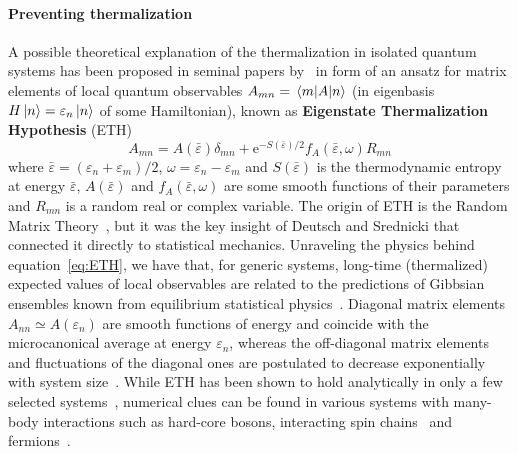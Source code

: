 \paragraph{Preventing thermalization} A possible theoretical explanation of the thermalization in isolated quantum systems
has been proposed in seminal papers by~\textcite{Deutsch19912046,Srednicki1994} in form of an ansatz for matrix elements of
local quantum observables \(A_{mn} = \matrixel{m}{A}{n}\) (in eigenbasis \(H\ket{n}=\varepsilon_n \ket{n}\) of some Hamiltonian),
known as \textbf{Eigenstate Thermalization Hypothesis} (ETH)
\begin{equation}
    A_{mn} = A(\bar{\varepsilon}) \delta_{mn} + \mathrm{e}^{-S(\bar{\varepsilon})/2}f_{A}(\bar{\varepsilon},\omega)R_{mn}
    \label{eq:ETH}
\end{equation}
where \(\bar{\varepsilon} = (\varepsilon_n+\varepsilon_m)/2\), \(\omega=\varepsilon_n-\varepsilon_m\) and \(S(\bar{\varepsilon})\) is
the thermodynamic entropy at energy \(\bar{\varepsilon}\),  \(A(\bar{\varepsilon})\) and \(f_{A}(\bar{\varepsilon},\omega)\) are
some smooth functions of their parameters and
\(R_{mn}\) is a random real or complex variable. The origin of ETH is the Random Matrix Theory~\autocite{Wigner1955548,mehta2004random},
but it was the key insight of Deutsch and Srednicki that connected it directly to statistical mechanics.
Unraveling the physics behind equation~\eqref{eq:ETH}, we have that, for generic systems,
long-time (thermalized) expected values of local observables are related to the predictions of Gibbsian ensembles
known from equilibrium statistical physics~\autocite{DAlessio2016}. Diagonal matrix elements \(A_{nn} \simeq A(\varepsilon_n)\) are smooth functions of energy and
coincide with the microcanonical average at energy \(\varepsilon_n\), whereas the off-diagonal matrix elements and fluctuations
of the diagonal ones are postulated to decrease exponentially with system size~\autocite{Beugeling2014}.
While ETH has been shown to hold analytically in only a few selected systems~\autocite{Magan2016}, numerical clues can be
found in various systems with many-body interactions such as hard-core bosons, interacting spin
chains~\autocite{Santos2010_2,Rigol2010,Khatami2013,Rigol2009a} and fermions~\autocite{Neuenhahn2012,Rigol2009}.

